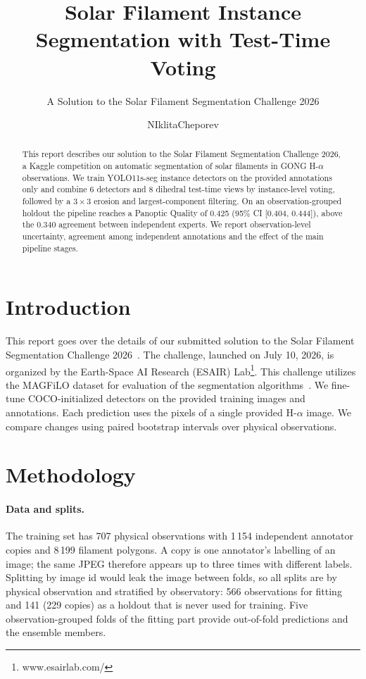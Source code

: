 \documentclass[sigconf]{acmart}
\begin{document}
\title{Solar Filament Instance Segmentation with Test-Time Voting}
\subtitle{A Solution to the Solar Filament Segmentation Challenge 2026} %

\author{NIklitaCheporev}

\begin{abstract}
This report describes our solution to the Solar Filament Segmentation Challenge 2026, a Kaggle competition on automatic segmentation of solar filaments in GONG H-$\alpha$ observations.
We train YOLO11s-seg instance detectors on the provided annotations only and combine 6 detectors and 8 dihedral test-time views by instance-level voting, followed by a $3\times3$ erosion and largest-component filtering.
On an observation-grouped holdout the pipeline reaches a Panoptic Quality of 0.425 (95\% CI [0.404, 0.444]), above the 0.340 agreement between independent experts.
We report observation-level uncertainty, agreement among independent annotations and the effect of the main pipeline stages.
\end{abstract}

\maketitle

\section{Introduction}
This report goes over the details of our submitted solution to the Solar Filament Segmentation Challenge 2026~\cite{challenge}. The challenge, launched on July 10, 2026, is organized by the Earth-Space AI Research (ESAIR) Lab\footnote{www.esairlab.com/}. This challenge utilizes the MAGFiLO dataset for evaluation of the segmentation algorithms~\cite{magfilo}.
We fine-tune COCO-initialized detectors on the provided training images and annotations. Each prediction uses the pixels of a single provided H-$\alpha$ image. We compare changes using paired bootstrap intervals over physical observations.

\section{Methodology}
\paragraph{Data and splits.}
The training set has 707 physical observations with 1\,154 independent annotator copies and 8\,199 filament polygons. A copy is one annotator's labelling of an image; the same JPEG therefore appears up to three times with different labels. Splitting by image id would leak the image between folds, so all splits are by physical observation and stratified by observatory: 566 observations for fitting and 141 (229 copies) as a holdout that is never used for training. Five observation-grouped folds of the fitting part provide out-of-fold predictions and the ensemble members.
\end{document}
